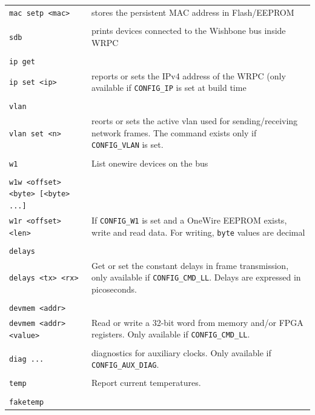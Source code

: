 \documentclass[a4paper, 12pt]{article}
\newcommand{\code}[1]{\texttt{#1}}
\newcommand{\codeHook}[1]{\mbox{\ttfamily\MakeTextUppercase{#1}}}
\begin{document}
\begin{longtable}{  p{7.5cm}  p{7cm} }
  \code{mac setp <mac>} & stores the persistent \codeHook{mac} address in Flash/EEPROM\\
 & \\
  \code{sdb} & prints devices connected to the Wishbone bus inside \codeHook{wrpc}\\
 & \\
  \code{ip get} & \\

  \code{ip set <ip>} & reports or sets the IPv4 address of the \codeHook{wrpc} (only available if \texttt{CONFIG\_IP} is set at build time\\
 & \\
  \code{vlan} & \\

  \code{vlan set <n>} & reorts or sets the active vlan used for sending/receiving network frames. The command exists only if \texttt{CONFIG\_VLAN} is set.\\
 & \\
  \code{w1} & List onewire devices on the bus\\
 & \\
  \code{w1w <offset> <byte> [<byte> ...]}& \\

  \code{w1r <offset> <len>} & If \texttt{CONFIG\_W1} is set and a OneWire \codeHook{eeprom} exists, write and read data. For writing, \texttt{byte} values are decimal\\
 & \\
  \code{delays}&\\

  \code{delays <tx> <rx>} & Get or set the constant delays in frame transmission, only available if \texttt{CONFIG\_CMD\_LL}. Delays are expressed in picoseconds.\\
 & \\
  \code{devmem <addr>} & \\

  \code{devmem <addr> <value>} & Read or write a 32-bit word from memory and/or FPGA registers. Only available if \texttt{CONFIG\_CMD\_LL}.\\
 & \\
  \code{diag ...} & diagnostics for auxiliary clocks. Only available if \texttt{CONFIG\_AUX\_DIAG}.\\
 & \\
  \code{temp} & Report current temperatures.\\
 & \\
  \code{faketemp} & \\


\end{longtable}
\end{document}
